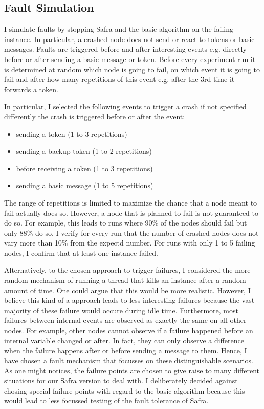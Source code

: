   
\subsection{Fault Simulation}
	I simulate faults by stopping Safra and the basic algorithm on the failing instance.
	In particular, a crashed node does not send or react to tokens or basic messages.
	Faults are triggered before and after interesting events e.g. directly before or after sending a basic message or token. 
	Before every experiment run it is determined at random which node is going to fail, on which event it is going to fail and after how many repetitions of this event e.g. after the 3rd time it forwards a token.
	
	In particular, I selected the following events to trigger a crash if not specified differently the crash is triggered before or after the event:
	\begin{itemize}
	   	\item sending a token (1 to 3 repetitions)
	   	\item sending a backup token (1 to 2 repetitions)
	   	\item before receiving a token (1 to 3 repetitions)
	   	\item sending a basic message (1 to 5 repetitions)
	\end{itemize}
	The range of repetitions is limited to maximize the chance that a node meant to fail actually does so. 
	However, a node that is planned to fail is not guaranteed to do so.
	For example, this leads to runs where 90\% of the nodes should fail but only 88\% do so.
	I verify for every run that the number of crashed nodes does not vary more than 10\% from the expectd number. For runs with only 1 to 5 failing nodes, I confirm that at least one instance failed.
	
	Alternatively, to the chosen approach to trigger failures, I considered the more random mechanism of running a thread that kills an instance after a random amount of time.
	One could argue that this would be more realistic.
	However, I believe this kind of a approach leads to less interesting failures because the vast majority of these failure would occure during idle time. 
	Furthermore, most failures between internal events are observed as exactly the same on all other nodes. 
	For example, other nodes cannot observe if a failure happened before an internal variable changed or after. 
	In fact, they can only observe a difference when the failure happens after or before sending a message to them.
	Hence, I have chosen a fault mechanism that focusses on these distinguishable scenarios.
	As one might notices, the failure points are chosen to give raise to many different situations for our Safra version to deal with. 
	I deliberately decided against chosing special failure points with regard to the basic algorithm because this would lead to less focussed testing of the fault tolerance of Safra.
	
